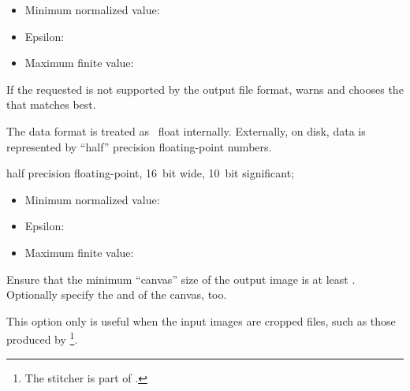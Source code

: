 \begin{codelist}
\begin{description}
    \begin{itemize}
    \item
      Minimum normalized value: 
    \item
      Epsilon: 
    \item
      Maximum finite value: 
    \end{itemize}
  \end{description}

  If the requested  is not supported by the output file
  format, \App{} warns and chooses the  that matches
  best.


  \noindent The  data
  format is treated as
  ~float internally.  Externally, on disk,
   data is represented by ``half'' precision
  floating-point numbers.

  half
  precision floating-point, 16~bit wide, 10~bit significant;

  \begin{itemize}
  \item
    Minimum normalized value: 
  \item
    Epsilon: 
  \item
    Maximum finite value: 
  \end{itemize}


  \label{opt:f}%
\item[-f \metavar{WIDTH}x\metavar{HEIGHT}%
  \optional{+x\metavar{XOFFSET}+y\metavar{YOFFSET}}]\itemend Ensure
  that the minimum ``canvas''%
  size of the output image is at least
  \classictimes{}.  Optionally specify
  the  and  of the canvas, too.

  This option only is useful when the input images are cropped
   files, such as those produced by
  \footnote{The
    stitcher  is part of
    .}.


\end{codelist}

